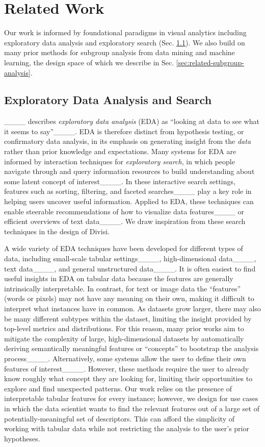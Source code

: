 \section{Related Work}
Our work is informed by foundational paradigms in visual analytics including exploratory data analysis and exploratory search (Sec. \ref{sec:related-eda}). 
We also build on many prior methods for subgroup analysis from data mining and machine learning, the design space of which we describe in Sec. \ref{sec:related-subgroup-analysis}.

\subsection{Exploratory Data Analysis and Search}
\label{sec:related-eda}

____ describes \textit{exploratory data analysis} (EDA) as ``looking at data to see what it seems to say''____.
EDA is therefore distinct from hypothesis testing, or confirmatory data analysis, in its emphasis on generating insight from the \textit{data} rather than prior knowledge and expectations.
Many systems for EDA are informed by interaction techniques for \textit{exploratory search}, in which people navigate through and query information resources to build understanding about some latent concept of interest____.
In these interactive search settings, features such as sorting, filtering, and faceted searches____ play a key role in helping users uncover useful information.
Applied to EDA, these techniques can enable steerable recommendations of how to visualize data features____ or efficient overviews of text data____.
We draw inspiration from these search techniques in the design of Divisi.

A wide variety of EDA techniques have been developed for different types of data, including small-scale tabular settings____, high-dimensional data____, text data____, and general unstructured data____.
It is often easiest to find useful insights in EDA on tabular data because the features are generally intrinsically interpretable. 
In contrast, for text or image data the ``features'' (words or pixels) may not have any meaning on their own, making it difficult to interpret what instances have in common.
As datasets grow larger, there may also be many different subtypes within the dataset, limiting the insight provided by top-level metrics and distributions.
For this reason, many prior works aim to mitigate the complexity of large, high-dimensional datasets by automatically deriving semantically meaningful features or ``concepts'' to bootstrap the analysis process____.
Alternatively, some systems allow the user to define their own features of interest____.
However, these methods require the user to already know roughly what concept they are looking for, limiting their opportunities to explore and find unexpected patterns.
Our work relies on the presence of interpretable tabular features for every instance; however, we design for use cases in which the data scientist wants to find the relevant features out of a large set of potentially-meaningful set of descriptors.
This can afford the simplicity of working with tabular data while not restricting the analysis to the user's prior hypotheses.

